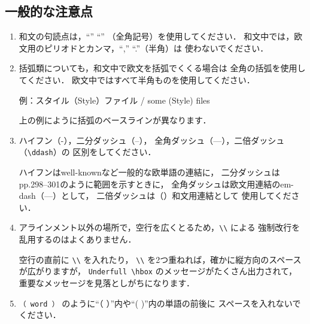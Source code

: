 \documentclass[paper]{jrsj}    %
\begin{document}
\subsection{一般的な注意点}\label{sec:typing}

\begin{enumerate}
\item
和文の句読点は，``'' ``''
（全角記号）を使用してください．
和文中では，欧文用のピリオドとカンマ，``,'' ``.''（半角）は
使わないでください．

\item
括弧類についても，和文中で欧文を括弧でくくる場合は
全角の括弧を使用してください．
欧文中ではすべて半角ものを使用してください．

\noindent
例：スタイル（Style）ファイル / some (Style) files

上の例にように括弧のベースラインが異なります．

\item
ハイフン（{\ttfamily -}），二分ダッシュ（{\ttfamily --}），
全角ダッシュ（{\ttfamily ---}），二倍ダッシュ（\verb/\ddash/）の
区別をしてください．

ハイフンはwell-knownなど一般的な欧単語の連結に，
二分ダッシュはpp.298--301のように範囲を示すときに，
全角ダッシュは欧文用連結のem-dash（---）として，
二倍ダッシュは（\ddash{}）和文用連結として
使用してください．

\item
アラインメント以外の場所で，空行を広くとるため，\verb/\\/ による
強制改行を乱用するのはよくありません．

空行の直前に \verb/\\/ を入れたり，
\verb/\\/ を2つ重ねれば，確かに縦方向のスペースが広がりますが，
\verb/Underfull \hbox/ のメッセージがたくさん出力されて，
重要なメッセージを見落としがちになります\cite{jiyuu}．

\item
\verb*/（ word ）/ のように``（ ）''内や``( )''内の単語の前後に
スペースを入れないでください．

%


\end{enumerate}
\end{document}
